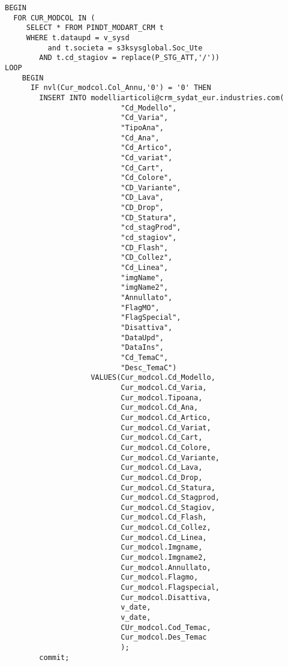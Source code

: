 \begin{lstlisting}
BEGIN
  FOR CUR_MODCOL IN (
     SELECT * FROM PINDT_MODART_CRM t
     WHERE t.dataupd = v_sysd 
          and t.societa = s3ksysglobal.Soc_Ute
        AND t.cd_stagiov = replace(P_STG_ATT,'/')) 
LOOP
    BEGIN
      IF nvl(Cur_modcol.Col_Annu,'0') = '0' THEN
        INSERT INTO modelliarticoli@crm_sydat_eur.industries.com(
                           "Cd_Modello",
                           "Cd_Varia",
                           "TipoAna",
                           "Cd_Ana",
                           "Cd_Artico",
                           "Cd_variat",
                           "Cd_Cart",
                           "Cd_Colore",
                           "CD_Variante",
                           "CD_Lava",
                           "CD_Drop",
                           "CD_Statura",
                           "cd_stagProd",
                           "cd_stagiov",
                           "CD_Flash",
                           "CD_Collez",
                           "Cd_Linea",
                           "imgName",
                           "imgName2",
                           "Annullato",
                           "FlagMO",
                           "FlagSpecial",
                           "Disattiva",
                           "DataUpd",
                           "DataIns",
                           "Cd_TemaC",
                           "Desc_TemaC")
                    VALUES(Cur_modcol.Cd_Modello,
                           Cur_modcol.Cd_Varia,
                           Cur_modcol.Tipoana,
                           Cur_modcol.Cd_Ana,
                           Cur_modcol.Cd_Artico,
                           Cur_modcol.Cd_Variat,
                           Cur_modcol.Cd_Cart,
                           Cur_modcol.Cd_Colore,
                           Cur_modcol.Cd_Variante,
                           Cur_modcol.Cd_Lava,
                           Cur_modcol.Cd_Drop,
                           Cur_modcol.Cd_Statura,
                           Cur_modcol.Cd_Stagprod,
                           Cur_modcol.Cd_Stagiov,
                           Cur_modcol.Cd_Flash,
                           Cur_modcol.Cd_Collez,
                           Cur_modcol.Cd_Linea,
                           Cur_modcol.Imgname,
                           Cur_modcol.Imgname2,
                           Cur_modcol.Annullato,
                           Cur_modcol.Flagmo,
                           Cur_modcol.Flagspecial,
                           Cur_modcol.Disattiva,
                           v_date,
                           v_date,
                           CUr_modcol.Cod_Temac,
                           Cur_modcol.Des_Temac
                           );
        commit;


\end{lstlisting}
